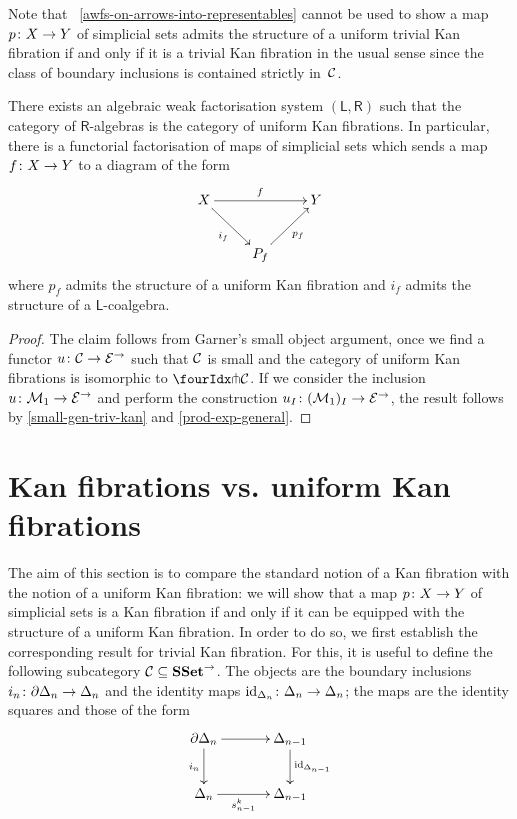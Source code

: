 \documentclass[reqno,10pt,a4paper,oneside]{amsart}
\begin{document}
Note that ~\cref{awfs-on-arrows-into-representables} cannot be used to show 
a map $p \co X \to Y$ of simplicial sets admits the structure of a uniform trivial Kan fibration if and only if it is a trivial Kan fibration in the usual sense since  the class of boundary inclusions  is contained strictly  in~$\cal{C}$. 

\begin{corollary} There exists an algebraic weak factorisation system $(\mathsf{L}, \mathsf{R})$
such that the category of $\mathsf{R}$-algebras is the category of uniform Kan fibrations. 
In particular, there is a functorial factorisation of maps of simplicial sets which sends
a map $f \co X \to Y$ to a diagram of the form
\[
\xymatrix{ 
X \ar[rr]^f \ar[dr]_{i_f}  & & Y \\
 & P_f \ar[ur]_{p_f} }
 \]
 where $p_f$ admits the structure of  a uniform Kan fibration and 
 $i_f$ admits the structure of a $\mathsf{L}$-coalgebra.
\end{corollary} 

\begin{proof} The claim follows from Garner's small object argument, once we find a 
functor $u \co \cal{C} \rightarrow \catE^\to$ such that $\cal{C}$ is small and the
category of uniform Kan fibrations is isomorphic to $\liftr{\cal{C}}$. If we consider
the inclusion $u \co \mathcal{M}_1 \to \cal{E}^\to$ and perform the construction
$u_\interval \co (\mathcal{M}_1)_\interval \to \catE^\to$, the result follows 
by \cref{small-gen-triv-kan} and \cref{prod-exp-general}. 
\end{proof}



\section{Kan fibrations vs. uniform Kan fibrations}
\label{section-kan-fib}

 The aim of this section is to compare the standard notion of a Kan fibration with the
 notion of a uniform Kan fibration: we will show that a map $p \co X \to Y$ of simplicial
 sets is a Kan fibration if and only if it can be equipped with the structure of a uniform
 Kan fibration. In order to do so, we first establish the corresponding result for 
 trivial Kan fibration. For this, it is useful to define the following subcategory $\cal{C} \subseteq \SSet^\to$. The objects are the boundary inclusions
$i_n \co \partial \Delta_n \to \Delta_n$ and the identity maps $\id_{\Delta_n} \co \Delta_n \to \Delta_n$; the
maps are the identity squares and those of the form
 \[
\xymatrix@C=1.2cm{
  \partial \Delta_n
  \ar[r]
  \ar[d]_{i_n}
&
  \Delta_{n-1}
  \ar[d]^{\id_{\Delta_{n-1}}}
\\
  \Delta_n
  \ar[r]_-{s^k_{n-1}}
&
  \Delta_{n-1}
}
\] 
\end{document}
